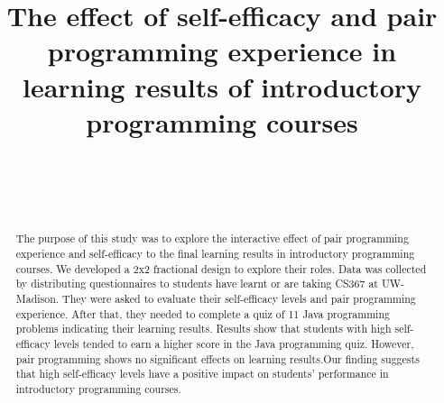 \documentclass{sigchi}
\def\plaintitle{ The effect of self-efficacy and pair programming experience in learning results of introductory programming courses}
\begin{document}
\title{\plaintitle}

\author{%
  \\
  \\
  \\
}

\maketitle

\begin{abstract}


The purpose of this study was to explore the interactive effect of pair programming experience and self-efficacy to the final learning results in introductory programming courses. We developed a 2x2 fractional design to explore their roles. Data was collected by distributing questionnaires to students have learnt or are taking CS367 at UW-Madison. They were asked to evaluate their self-efficacy levels and pair programming experience. After that, they needed to complete a quiz of 11 Java programming problems indicating their learning results. Results show that students with high self-efficacy levels tended to earn a higher score in the Java programming quiz.  However, pair programming shows no significant effects on learning results.Our finding suggests that high self-efficacy levels have a positive impact on students' performance in introductory programming courses.

\end{abstract}

\end{document}
